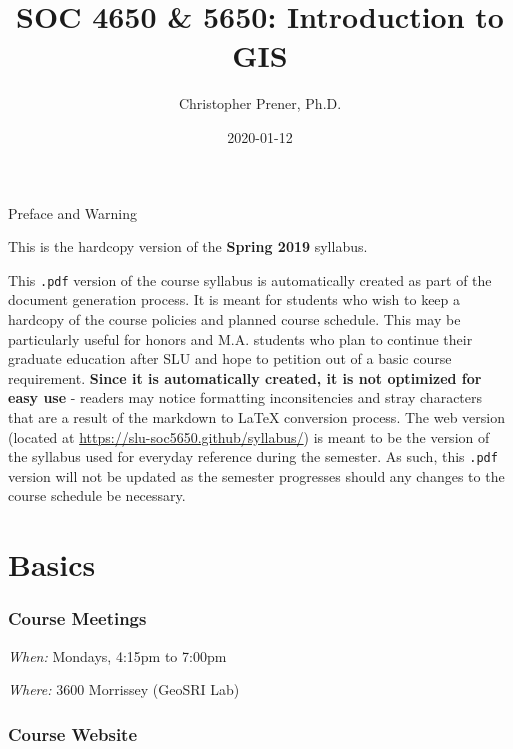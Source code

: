 \documentclass[
]{book}
\title{SOC 4650 \& 5650: Introduction to GIS}
\author{Christopher Prener, Ph.D.}
\date{2020-01-12}
\begin{document}
\maketitle

\begin{center}
{\huge Preface and Warning} \\
\end{center}
\vspace{5mm}
This is the hardcopy version of the \textbf{Spring 2019} syllabus.
\vspace{5mm}
\par \noindent This \texttt{.pdf} version of the course syllabus is automatically created as part of the document generation process. It is meant for students who wish to keep a hardcopy of the course policies and planned course schedule. This may be particularly useful for honors and M.A. students who plan to continue their graduate education after SLU and hope to petition out of a basic course requirement. \textbf{Since it is automatically created, it is not optimized for easy use} - readers may notice formatting inconsitencies and stray characters that are a result of the markdown to \LaTeX{} conversion process. The web version (located at \href{https://slu-soc5650.github/syllabus/}{https://slu-soc5650.github/syllabus/}) is meant to be the version of the syllabus used for everyday reference during the semester. As such, this \texttt{.pdf} version will not be updated as the semester progresses should any changes to the course schedule be necessary.

\hypertarget{basics}{%
\chapter*{Basics}\label{basics}}

\hypertarget{course-meetings}{%
\subsection*{Course Meetings}\label{course-meetings}}

\emph{When:} Mondays, 4:15pm to 7:00pm

\emph{Where:} 3600 Morrissey (GeoSRI Lab)

\hypertarget{course-website}{%
\subsection*{Course Website}\label{course-website}}
\end{document}

